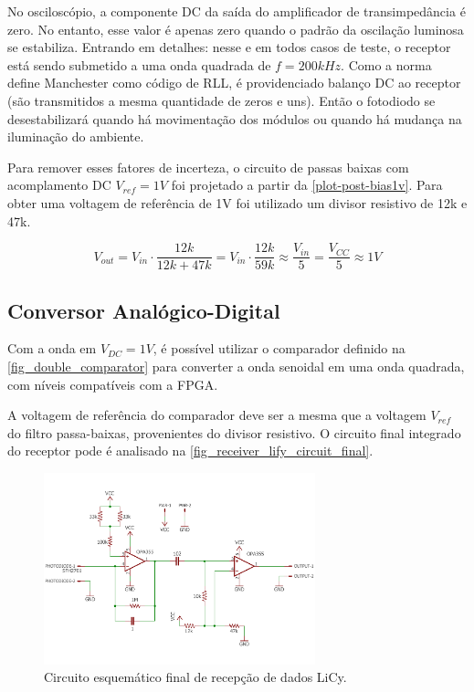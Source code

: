 	No osciloscópio, a componente DC da saída do amplificador de transimpedância é zero. No entanto, esse valor é apenas zero quando o padrão da oscilação luminosa se estabiliza. Entrando em detalhes: nesse e em todos casos de teste, o receptor está sendo submetido a uma onda quadrada de $f = 200kHz$. Como a norma define Manchester como código de RLL, é providenciado balanço DC ao receptor (são transmitidos a mesma quantidade de zeros e uns). Então o fotodiodo se desestabilizará quando há movimentação dos módulos ou quando há mudança na iluminação do ambiente.
	
	Para remover esses fatores de incerteza, o circuito de passas baixas com acomplamento DC $V_{ref} = 1V$ foi projetado a partir da \autoref{plot-post-bias1v}. Para obter uma voltagem de referência de 1V foi utilizado um divisor resistivo de 12k e 47k. 
	
	\begin{equation}
	V_{out} = V_{in} \cdot \frac{12k}{12k + 47k} = V_{in} \cdot \frac{12k}{59k} \approx \frac{V_{in}}{5} = \frac{V_{CC}}{5} \approx 1V
	\end{equation}
	
	\subsection{Conversor Analógico-Digital}
	
	Com a onda em $V_{DC} = 1V$, é possível utilizar o comparador definido na \autoref{fig_double_comparator} para converter a onda senoidal em uma onda quadrada, com níveis compatíveis com a FPGA.
	
	A voltagem de referência do comparador deve ser a mesma que a voltagem $V_{ref}$ do filtro passa-baixas, provenientes do divisor resistivo. O circuito final integrado do receptor pode é analisado na \autoref{fig_receiver_lify_circuit_final}.

	\begin{figure}[htb]
		\caption{\label{fig_receiver_lify_circuit_final}Circuito esquemático final de recepção de dados LiCy.}
		\centering
		\includegraphics[width=0.7\textwidth, trim={0cm 1cm 0cm 1cm}, clip]{circuits/receiver_lify_final.pdf}
	\end{figure}
	
